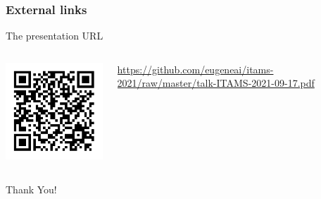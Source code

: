 \documentclass[10pt]{beamer}
\begin{document}
\begin{frame}
  \frametitle{External links}
  The presentation URL
  \begin{columns}
    \begin{column}{0.3\textwidth}
      \includegraphics[width=1\linewidth]{talk.png}
    \end{column}
    \begin{column}{0.7\textwidth}
      \url{
https://github.com/eugeneai/itams-2021/raw/master/talk-ITAMS-2021-09-17.pdf}
    \end{column}
  \end{columns}
  \vspace{3em}
  \begin{center}
  \Large Thank You!
\end{center}
\end{frame}

\maketitle
\end{document}
